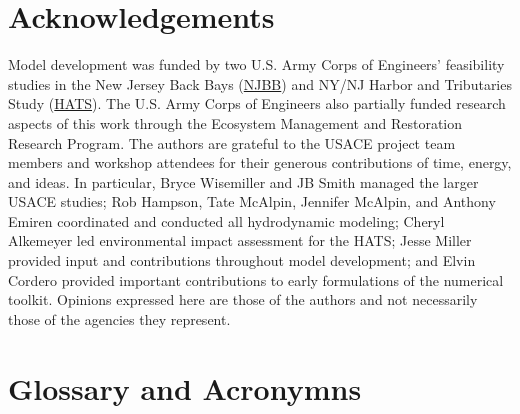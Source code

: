 \documentclass[
]{book}
\begin{document}
\hypertarget{acknowledgements}{%
\section*{Acknowledgements}\label{acknowledgements}}

Model development was funded by two U.S. Army Corps of Engineers' feasibility studies in the New Jersey Back Bays (\href{https://www.nap.usace.army.mil/Missions/Civil-Works/New-Jersey-Back-Bays-Coastal-Storm-Risk-Management/}{NJBB}) and NY/NJ Harbor and Tributaries Study (\href{https://www.nan.usace.army.mil/Missions/Civil-Works/Projects-in-New-York/New-York-New-Jersey-Harbor-Tributaries-Focus-Area-Feasibility-Study/}{HATS}). The U.S. Army Corps of Engineers also partially funded research aspects of this work through the Ecosystem Management and Restoration Research Program. The authors are grateful to the USACE project team members and workshop attendees for their generous contributions of time, energy, and ideas. In particular, Bryce Wisemiller and JB Smith managed the larger USACE studies; Rob Hampson, Tate McAlpin, Jennifer McAlpin, and Anthony Emiren coordinated and conducted all hydrodynamic modeling; Cheryl Alkemeyer led environmental impact assessment for the HATS; Jesse Miller provided input and contributions throughout model development; and Elvin Cordero provided important contributions to early formulations of the numerical toolkit. Opinions expressed here are those of the authors and not necessarily those of the agencies they represent.

\hypertarget{glossary-and-acronymns}{%
\section*{Glossary and Acronymns}\label{glossary-and-acronymns}}
\end{document}
